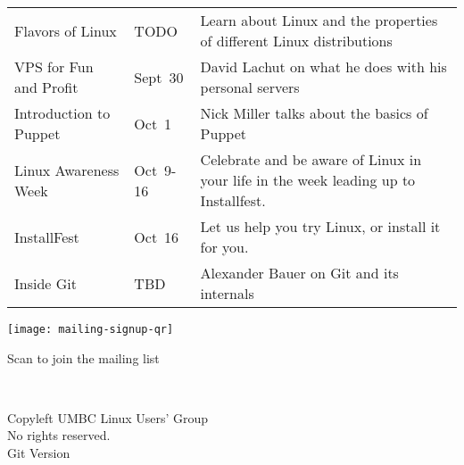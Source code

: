 \documentclass[11pt]{article}
\begin{document}
\begin{multicols*}{2}
\begin{tabular*}{\hsize}{>{\raggedright}p{0.23\hsize} >{\centering}p{0.1\hsize} p{0.55\hsize}}
    Flavors of Linux & TODO & Learn about Linux and the properties of different
        Linux distributions \\

    VPS for Fun and Profit & Sept~30 & David Lachut on what he does with his
    personal servers \\

    Introduction to Puppet & Oct~1 & Nick Miller talks about the basics of Puppet \\

    Linux Awareness Week & \mbox{Oct~9-16} & Celebrate and be aware of
        Linux in your life in the week leading up to Installfest. \\

    InstallFest & Oct~16 & Let us help you try Linux, or install it
        for you. \\

    Inside Git & TBD & Alexander Bauer on Git and its internals \\

\end{tabular*}

    \begin{center}
        \texttt{[image: mailing-signup-qr]}
        \vspace{-3em}
        \parbox{\hsize}{\centering \parbox{0.3\hsize}{ \centering Scan to join the mailing list }}
    \end{center}

~

\phantom{x}
\vfill
\begin{center} \tiny
    \textcopyleft{} Copyleft \the\year{} UMBC Linux Users' Group \\
    No rights reserved. \\
    Git Version 
\end{center}
\end{multicols*}
\end{document}
